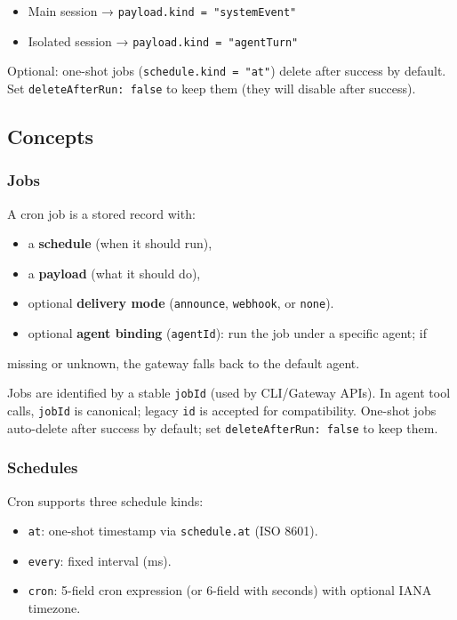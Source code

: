 \begin{itemize}
  \item Main session → \texttt{payload.kind = "systemEvent"}
  \item Isolated session → \texttt{payload.kind = "agentTurn"}
\end{itemize}


Optional: one-shot jobs (\texttt{schedule.kind = "at"}) delete after success by default. Set
\texttt{deleteAfterRun: false} to keep them (they will disable after success).

\subsection{Concepts}


\subsubsection{Jobs}


A cron job is a stored record with:

\begin{itemize}
  \item a \textbf{schedule} (when it should run),
  \item a \textbf{payload} (what it should do),
  \item optional \textbf{delivery mode} (\texttt{announce}, \texttt{webhook}, or \texttt{none}).
  \item optional \textbf{agent binding} (\texttt{agentId}): run the job under a specific agent; if
\end{itemize}

missing or unknown, the gateway falls back to the default agent.

Jobs are identified by a stable \texttt{jobId} (used by CLI/Gateway APIs).
In agent tool calls, \texttt{jobId} is canonical; legacy \texttt{id} is accepted for compatibility.
One-shot jobs auto-delete after success by default; set \texttt{deleteAfterRun: false} to keep them.

\subsubsection{Schedules}


Cron supports three schedule kinds:

\begin{itemize}
  \item \texttt{at}: one-shot timestamp via \texttt{schedule.at} (ISO 8601).
  \item \texttt{every}: fixed interval (ms).
  \item \texttt{cron}: 5-field cron expression (or 6-field with seconds) with optional IANA timezone.
\end{itemize}


